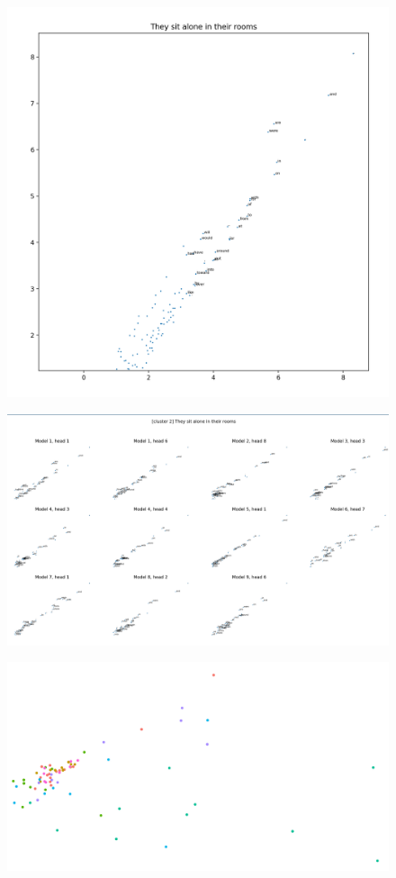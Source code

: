\documentclass{article}
\begin{document}
\begin{figure}
    \includegraphics[width=\textwidth]{images/knockout-one-prompt.png}
\end{figure}

\begin{figure}
    \includegraphics[width=\textwidth]{images/knockout-one-prompt-many-models.png}
\end{figure}

\begin{figure}
    \includegraphics[width=\textwidth]{images/knockout-64prompt.png}
\end{figure}
\end{document}
